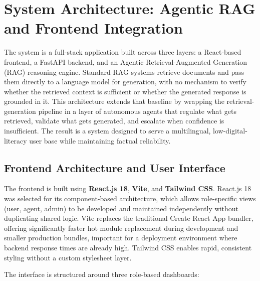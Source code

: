 \section{System Architecture: Agentic RAG and Frontend Integration}

The system is a full-stack application built across three layers: a React-based 
frontend, a FastAPI backend, and an Agentic Retrieval-Augmented Generation (RAG) 
reasoning engine. Standard RAG systems retrieve documents and pass them directly 
to a language model for generation, with no mechanism to verify whether the 
retrieved context is sufficient or whether the generated response is grounded in 
it. This architecture extends that baseline by wrapping the retrieval-generation 
pipeline in a layer of autonomous agents that regulate what gets retrieved, 
validate what gets generated, and escalate when confidence is insufficient. The 
result is a system designed to serve a multilingual, low-digital-literacy user 
base while maintaining factual reliability.

\subsection{Frontend Architecture and User Interface}

The frontend is built using \textbf{React.js 18}, \textbf{Vite}, and 
\textbf{Tailwind CSS}. React.js 18 was selected for its component-based 
architecture, which allows role-specific views (user, agent, admin) to be 
developed and maintained independently without duplicating shared logic. Vite 
replaces the traditional Create React App bundler, offering significantly faster 
hot module replacement during development and smaller production bundles, 
important for a deployment environment where backend response times are already 
high. Tailwind CSS enables rapid, consistent styling without a custom stylesheet 
layer.

The interface is structured around three role-based dashboards:

